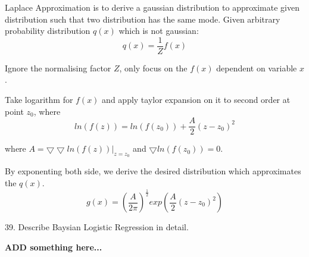 \documentclass[11pt,a4paper]{article}
\newcommand{\BOLD}[1]{\textbf{#1}}
\newcommand{\half}{\frac{1}{2}}
\begin{document}
    Laplace Approximation is to derive a gaussian distribution to approximate given distribution such that two distribution has the same mode.
    Given arbitrary probability distribution $q(x)$ which is not gaussian:
    $$ q(x) = \frac{1}{Z} f(x) $$

    Ignore the normalising factor $Z$, only focus on the $f(x)$ dependent on variable $x$.

    Take logarithm for $f(x)$ and apply taylor expansion on it to second order at point $z_0$, where 
    $$ ln( f(z) ) = ln( f(z_0) ) + \frac{A}{2} (z - z_0)^2 $$

    where $A = \bigtriangledown \bigtriangledown ln( f(z) )|_{z=z_0}$ and $ \bigtriangledown ln(f(z_0)) = 0 $.

    By exponenting both side, we derive the desired distribution which approximates the $q(x)$.
    $$
        g (x) = (\frac{A}{2\pi})^{\half} exp ( \frac{A}{2}(z - z_0)^2 )
    $$

39. Describe Baysian Logistic Regression in detail.

    \BOLD{ADD something here...}
\end{document}
